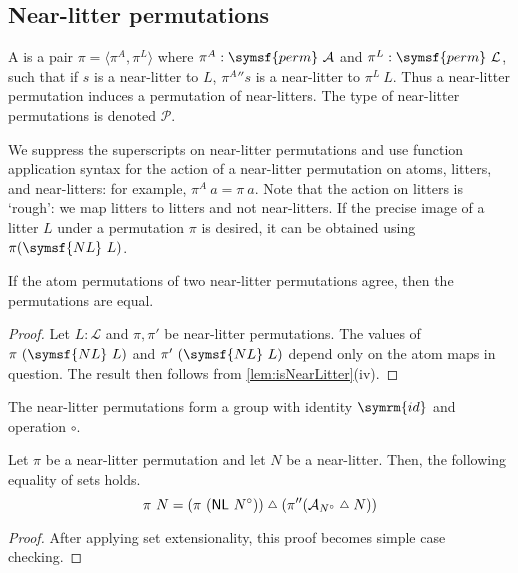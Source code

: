 \subsection{Near-litter permutations}

\begin{definition}
    A  is a pair \( \pi = \langle \pi^A, \pi^L \rangle \) where \( \pi^A : \symsf{perm}\ \mathcal A \) and \( \pi^L : \symsf{perm}\ \mathcal L \), such that if \( s \) is a near-litter to \( L \), \( {\pi^A} '' s \) is a near-litter to \( \pi^L\ L \).
    Thus a near-litter permutation induces a permutation of near-litters.
    The type of near-litter permutations is denoted \( \mathcal P \).
\end{definition}
We suppress the superscripts on near-litter permutations and use function application syntax for the action of a near-litter permutation on atoms, litters, and near-litters: for example, \( \pi^A\ a = \pi\ a \).
Note that the action on litters is `rough': we map litters to litters and not near-litters.
If the precise image of a litter \( L \) under a permutation \( \pi \) is desired, it can be obtained using \( \pi(\symsf{NL}\ L) \).
\begin{lemma}
    \label{lem:NearLitterPerm.atomPerm_injective}
    If the atom permutations of two near-litter permutations agree, then the permutations are equal.
\end{lemma}
\begin{proof}
    Let \( L : \mathcal L \) and \( \pi, \pi' \) be near-litter permutations.
    The values of \( \pi\ (\symsf{NL}\ L) \) and \( \pi'\ (\symsf{NL}\ L) \) depend only on the atom maps in question.
    The result then follows from \cref{lem:isNearLitter}(iv).
\end{proof}
\begin{lemma}
    The near-litter permutations form a group with identity \( \symrm{id} \) and operation \( \circ \).
\end{lemma}
\begin{lemma}
    \label{lem:smul_nearLitter_eq_smul_symmDiff_smul}
    Let \( \pi \) be a near-litter permutation and let \( N \) be a near-litter.
    Then, the following equality of sets holds.
    \[ \pi\ N = (\pi\ (\mathsf{NL}\ N^\circ)) \symmdiff (\pi '' (\mathcal A_{N^\circ} \symmdiff N)) \]
\end{lemma}
\begin{proof}
    After applying set extensionality, this proof becomes simple case checking.
\end{proof}
